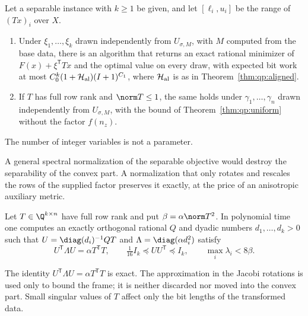 \begin{theorem}\label{thm:qp:sep}
Let a separable instance with $k\ge1$ be given, and let $[\ell_i,u_i]$ be the
range of $(Tx)_i$ over $X$.
\begin{enumerate}[label=(\alph*)]
\item Under $\xi_1,\dots,\xi_k$ drawn independently from $U_{\sigma,M}$,
 with $M$ computed from the base data, there is an algorithm that returns an
 exact rational minimizer of $F(x)+\xi^{\mathsf T} Tx$ and the optimal value on every
 draw, with expected bit work at most $C_0^k(1+\mathcal H_{\rm al})(I+1)^{C_1}$,
 where $\mathcal H_{\rm al}$ is as in Theorem~\ref{thm:qp:aligned}.
\item If $T$ has full row rank and $\norm T\le1$, the same holds under
 $\gamma_1,\dots,\gamma_n$ drawn independently from $U_{\sigma,M}$,
 with the bound of Theorem~\ref{thm:qp:uniform} without the factor $f(n_z)$.
\end{enumerate}
The number of integer variables is not a parameter.
\end{theorem}

A general spectral normalization of the separable objective would destroy
the separability of the convex part. A normalization that only rotates and
rescales the rows of the supplied factor preserves it exactly, at the price
of an anisotropic auxiliary metric.

\begin{lemma}\label{lem:qp:aniso}
Let $T\in\Q^{k\times n}$ have full row rank and put $\beta=\alpha\norm T^2$.
In polynomial time one computes an exactly orthogonal rational $Q$ and dyadic
numbers $d_1,\dots,d_k>0$ such that $U=\diag(d_i)^{-1}QT$ and
$\Lambda=\diag(\alpha d_i^2)$ satisfy
\[
 U^{\mathsf T}\Lambda U=\alpha T^{\mathsf T} T,\qquad
 \tfrac1{16}I_k\preceq UU^{\mathsf T}\preceq I_k,\qquad
 \max_i\lambda_i<8\beta .
\]
\end{lemma}

The identity $U^{\mathsf T}\Lambda U=\alpha T^{\mathsf T} T$ is exact. The approximation in
the Jacobi rotations is used only to bound the frame; it is neither discarded
nor moved into the convex part. Small singular values of $T$ affect only the
bit lengths of the transformed data.

